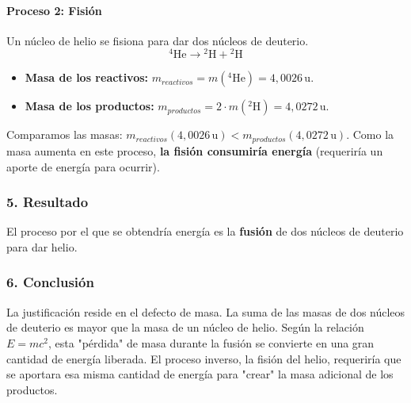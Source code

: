\paragraph{Proceso 2: Fisión}
Un núcleo de helio se fisiona para dar dos núcleos de deuterio.
$$ {}^{4}\text{He} \longrightarrow {}^{2}\text{H} + {}^{2}\text{H} $$
\begin{itemize}
    \item \textbf{Masa de los reactivos:} $m_{reactivos} = m({}^{4}\text{He}) = 4,0026 \, \text{u}$.
    \item \textbf{Masa de los productos:} $m_{productos} = 2 \cdot m({}^{2}\text{H}) = 4,0272 \, \text{u}$.
\end{itemize}
Comparamos las masas: $m_{reactivos} (4,0026 \, \text{u}) < m_{productos} (4,0272 \, \text{u})$.
Como la masa aumenta en este proceso, \textbf{la fisión consumiría energía} (requeriría un aporte de energía para ocurrir).

\subsubsection*{5. Resultado}
\begin{cajaresultado}
El proceso por el que se obtendría energía es la \textbf{fusión} de dos núcleos de deuterio para dar helio.
\end{cajaresultado}

\subsubsection*{6. Conclusión}
\begin{cajaconclusion}
La justificación reside en el defecto de masa. La suma de las masas de dos núcleos de deuterio es mayor que la masa de un núcleo de helio. Según la relación $E=mc^2$, esta "pérdida" de masa durante la fusión se convierte en una gran cantidad de energía liberada. El proceso inverso, la fisión del helio, requeriría que se aportara esa misma cantidad de energía para "crear" la masa adicional de los productos.
\end{cajaconclusion}

\newpage